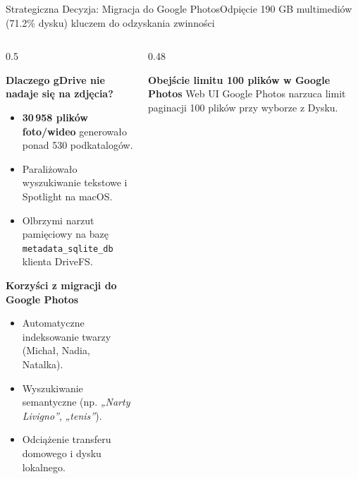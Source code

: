 \documentclass[aspectratio=169, 10pt]{beamer}
\begin{document}

\begin{frame}{Strategiczna Decyzja: Migracja do Google Photos}{Odpięcie 190 GB multimediów (71.2\% dysku) kluczem do odzyskania zwinności}
  \begin{columns}[T]
    \begin{column}{0.5\textwidth}
      \begin{block}{\textbf{Dlaczego gDrive nie nadaje się na zdjęcia?}}
        \begin{itemize}
          \item \textbf{30\,958 plików foto/wideo} generowało ponad 530 podkatalogów.
          \item Paraliżowało wyszukiwanie tekstowe i Spotlight na macOS.
          \item Olbrzymi narzut pamięciowy na bazę \texttt{metadata\_sqlite\_db} klienta DriveFS.
        \end{itemize}
      \end{block}

      \vspace{0.2cm}
      \begin{exampleblock}{\textbf{Korzyści z migracji do Google Photos}}
        \begin{itemize}
          \item Automatyczne indeksowanie twarzy (Michał, Nadia, Natalka).
          \item Wyszukiwanie semantyczne (np. \textit{„Narty Livigno”}, \textit{„tenis”}).
          \item Odciążenie transferu domowego i dysku lokalnego.
        \end{itemize}
      \end{exampleblock}
    \end{column}

    \begin{column}{0.48\textwidth}
      \begin{block}{\textbf{Obejście limitu 100 plików w Google Photos}}
        \footnotesize
        Web UI Google Photos narzuca limit paginacji 100 plików przy wyborze z Dysku.
        

\end{block}
\end{column}
\end{columns}
\end{frame}
\end{document}
